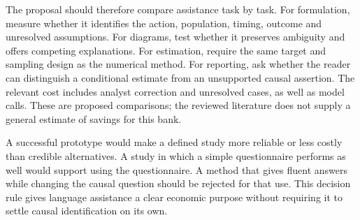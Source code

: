 The proposal should therefore compare assistance task by task. For formulation,
measure whether it identifies the action, population, timing, outcome and
unresolved assumptions. For diagrams, test whether it preserves ambiguity and
offers competing explanations. For estimation, require the same target and
sampling design as the numerical method. For reporting, ask whether the
reader can distinguish a conditional estimate from an unsupported causal
assertion. The relevant cost includes analyst correction and unresolved cases,
as well as model calls. These are proposed comparisons; the reviewed literature
does not supply a general estimate of savings for this bank.

A successful prototype would make a defined study more reliable or less costly
than credible alternatives. A study in which a simple questionnaire performs
as well would support using the questionnaire. A method that gives fluent
answers while changing the causal question should be rejected for that use.
This decision rule gives language assistance a clear economic purpose without
requiring it to settle causal identification on its own.
